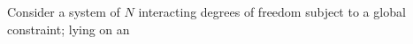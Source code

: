 Consider a system of $N$ interacting degrees of freedom subject to a global constraint; lying on an $$